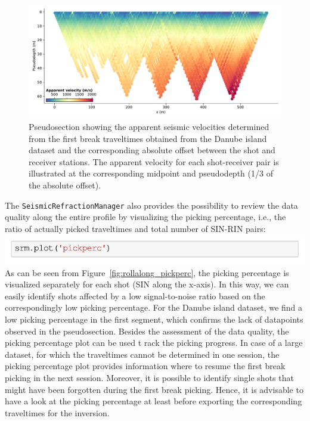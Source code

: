 \documentclass[a4paper,fleqn]{cas-sc}
\begin{document}
\begin{figure}
	\centering
	\includegraphics[width=.75\textwidth]{figures/rollalong_pseudosection.pdf}
	\caption{Pseudosection showing the apparent seismic velocities determined from the first break traveltimes obtained from the Danube island dataset and the corresponding absolute offset between the shot and receiver stations. The apparent velocity for each shot-receiver pair is illustrated at the corresponding midpoint and pseudodepth (1/3 of the absolute offset).}
	\label{fig:rollalong_pseudosection}
\end{figure}

The \texttt{SeismicRefractionManager} also provides the possibility to review the data quality along the entire profile by visualizing the picking percentage, i.e., the ratio of actually picked traveltimes and total number of SIN-RIN pairs:
\newline
\includegraphics[width=.5\textwidth]{./figures/plot_pickperc_danube.pdf}
\newline
As can be seen from Figure~\ref{fig:rollalong_pickperc}, the picking percentage is visualized separately for each shot (SIN along the x-axis). In this way, we can easily identify shots affected by a low signal-to-noise ratio based on the correspondingly low picking percentage. For the Danube island dataset, we find a low picking percentage in the first segment, which confirms the lack of datapoints observed in the pseudosection.
Besides the assessment of the data quality, the picking percentage plot can be used t rack the picking progress. In case of a large dataset, for which the traveltimes cannot be determined in one session, the picking percentage plot provides information where to resume the first break picking in the next session. Moreover, it is possible to identify single shots that might have been forgotten during the first break picking. Hence, it is advisable to have a look at the picking percentage at least before exporting the corresponding traveltimes for the inversion.
\end{document}
